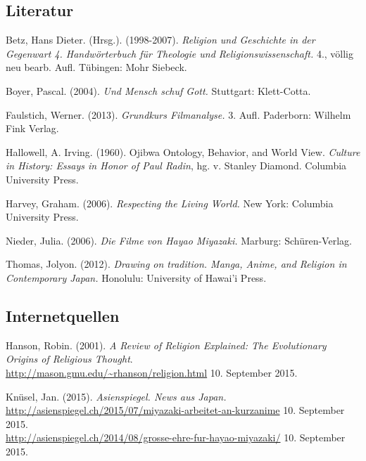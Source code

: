 \documentclass[a4paper]{article}
\begin{document}
\newpage
\renewcommand\refname{Bibliographie}
\begin{thebibliography}{9}

\subsection*{Literatur}

	Betz, Hans Dieter. (Hrsg.). (1998-2007).
	\emph{Religion und Geschichte in der Gegenwart 4. Handwörterbuch für Theologie und Religionswissenschaft.} 4., völlig neu bearb. Aufl. Tübingen: Mohr Siebeck.

	Boyer, Pascal.
	(2004).
	\emph{Und Mensch schuf Gott.}
	Stuttgart: Klett-Cotta.

	Faulstich, Werner.
	(2013).
	\emph{Grundkurs Filmanalyse.} 
	3. Aufl. 
	Paderborn: Wilhelm Fink Verlag.

	Hallowell, A. Irving. (1960). \glqq Ojibwa Ontology, Behavior, and World View\glqq. \emph{Culture in History: Essays in Honor of Paul Radin}, hg. v. Stanley Diamond. Columbia University Press. 

	Harvey, Graham.
	(2006).
	\emph{Respecting the Living World.}
	New York: Columbia University Press.

	Nieder, Julia. 
	(2006). 
	\emph{Die Filme von Hayao Miyazaki.}
	Marburg: Schüren-Verlag.

	Thomas, Jolyon.
	(2012).
	\emph{Drawing on tradition. Manga, Anime, and Religion in Contemporary Japan.}
	Honolulu: University of Hawai'i Press.

\subsection*{Internetquellen}

	Hanson, Robin. (2001). \emph{A Review of Religion Explained: The Evolutionary Origins of Religious Thought}. \\ \url{http://mason.gmu.edu/~rhanson/religion.html} 10. September 2015.

	Knüsel, Jan. (2015). \emph{Asienspiegel. News aus Japan.}\\ \url{http://asienspiegel.ch/2015/07/miyazaki-arbeitet-an-kurzanime} 10. September 2015.\\ \url{http://asienspiegel.ch/2014/08/grosse-ehre-fur-hayao-miyazaki/} 10. September 2015.


\end{thebibliography}
\end{document}
